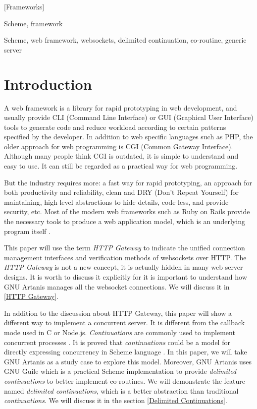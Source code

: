 \documentclass[numbers,numberedpars]{sigplanconf}
\begin{document}
[Frameworks]

\terms
Scheme, framework

\keywords
Scheme, web framework, websockets, delimited continuation, co-routine, generic server

\section{Introduction}

A web framework is a library for rapid prototyping in web development, and usually provide CLI (Command Line Interface) or GUI (Graphical User Interface) tools to generate code and reduce workload according to certain patterns specified by the developer.
In addition to web specific languages such as PHP, the older approach for web programming is CGI (Common Gateway Interface). Although many people think CGI is outdated, it is simple to understand and easy to use. It can still be regarded as a practical way for web programming.

But the industry requires more: a fast way for rapid prototyping, an approach for both productivity and reliability, clean and DRY (Don't Repeat Yourself) for maintaining, high-level abstractions to hide details, code less, and provide security, etc. Most of the modern web frameworks such as Ruby on Rails provide the necessary tools to produce a web application model, which is an underlying program itself \citep{1597080}. 

This paper will use the term {\it HTTP Gateway} to indicate the unified connection management interfaces and verification methods of websockets over HTTP. The {\it HTTP Gateway} is not a new concept, it is actually hidden in many web server designs. It is worth to discuss it explicitly for it is important to understand how GNU Artanis manages all the websocket connections. We will discuss it in \ref{HTTP Gateway}.

In addition to the discussion about HTTP Gateway, this paper will show a different way to implement a concurrent server. It is different from the callback mode used in C or Node.js. {\it Continuations} are commonly used to implement concurrent processes
\citep{Krishnamurthi2007}\citep{Hieb:1990:CC:99164.99178}\citep{Hieb:1994:SUB:184324.184330}.
It is proved that {\it continuations} could be a model for directly expressing concurrency in Scheme language \citep{shivers1997continuations}.
In this paper, we will take GNU Artanis as a study case to explore this model. Moreover,
GNU Artanis uses GNU Guile which is a practical Scheme implementation to provide {\it delimited continuations} to better implement co-routines.
We will demonstrate the feature named {\it delimited continuations}, which is a better abstraction than traditional {\it continuations}. We will discuss it in the section \ref{Delimited Continuations}.
\end{document}
